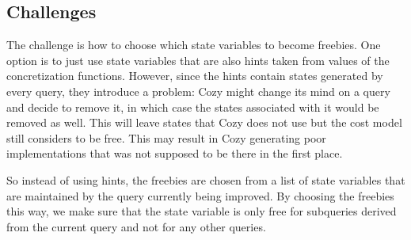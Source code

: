 \subsection{Challenges}
The challenge is how to choose which state variables to become freebies.
One option is to just use state variables that are also hints taken from values
of the concretization functions. However, since the hints contain states
generated by every query, they introduce a problem: Cozy might change its mind
on a query and decide to remove it, in which case the states associated with it
would be removed as well. This will leave states that Cozy does not use but the
cost model still considers to be free. This may result in Cozy generating poor
implementations that was not supposed to be there in the first place.

So instead of using hints, the freebies are chosen from a list of state
variables that are maintained by the query currently being improved. By choosing
the freebies this way, we make sure that the state variable is only free for
subqueries derived from the current query and not for any other queries.
